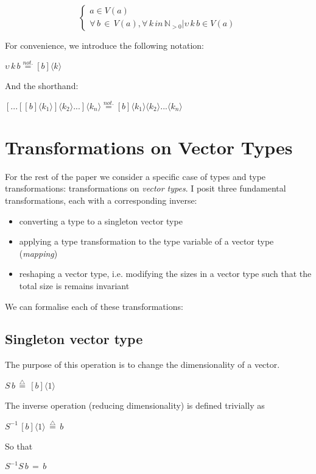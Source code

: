 \documentclass{article}
\begin{document}
\[
\begin{cases}
a\in V(a)\\
\forall\, b\,\in\, V(a),\forall\, k\, in\,\mathbb{N}_{>0}|\upsilon\, k\, b\in V(a)
\end{cases}
\]


For convenience, we introduce the following notation: 

\emph{$\upsilon\, k\, b\overset{not.}{=}[b]\langle k\rangle$}

And the shorthand:

\emph{$[...[[b]\langle k_{1}\rangle]\langle k_{2}\rangle...]\langle k_{n}\rangle\overset{not.}{=}[b]\langle k_{1}\rangle\langle k_{2}\rangle...\langle k_{n}\rangle$}


\section{Transformations on Vector Types }

For the rest of the paper we consider a specific case of types and
type transformations: transformations on \emph{vector types}. I posit
three fundamental transformations, each with a corresponding inverse:
\begin{itemize}
\item converting a type to a singleton vector type
\item applying a type transformation to the type variable of a vector type
(\emph{mapping})
\item reshaping a vector type, i.e. modifying the sizes in a vector type
such that the total size is remains invariant
\end{itemize}
We can formalise each of these transformations:


\subsection{Singleton vector type }

The purpose of this operation is to change the dimensionality of a
vector. 

$S\, b\,\overset{{\scriptscriptstyle \triangle}}{=}\,[b]\langle1\rangle$

The inverse operation (reducing dimensionality) is defined trivially
as

$S^{-1}\,[b]\langle1\rangle\,\overset{{\scriptscriptstyle \triangle}}{=}\, b$

So that

$S^{-1}S\, b\,=\, b$
\end{document}
